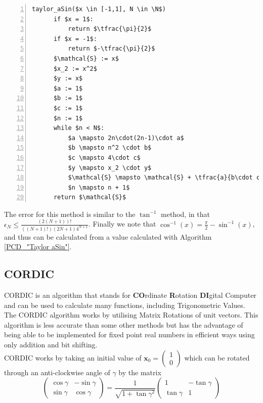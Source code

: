 {%
\begin{lstlisting}[numbers=left,frame=single,mathescape,caption={Taylor Method for \(\sin^{-1}\)},label={PCD_"Taylor aSin"}]
  taylor_aSin($x \in [-1,1], N \in \N$)
      if $x = 1$:
          return $\tfrac{\pi}{2}$
      if $x = -1$:
          return $-\tfrac{\pi}{2}$
      $\mathcal{S} := x$
      $x_2 := x^2$
      $y := x$
      $a := 1$
      $b := 1$
      $c := 1$
      $n := 1$
      while $n < N$:
          $a \mapsto 2n\cdot(2n-1)\cdot a$
          $b \mapsto n^2 \cdot b$
          $c \mapsto 4\cdot c$
          $y \mapsto x_2 \cdot y$
          $\mathcal{S} \mapsto \mathcal{S} + \tfrac{a}{b\cdot c \cdot(2n+1)}\cdot y$
          $n \mapsto n + 1$
      return $\mathcal{S}$
\end{lstlisting}

The error for this method is similar to the \(\tan^{-1}\) method, in that \(\epsilon_N \le \frac{(2(N+1))!}{((N+1)!)(2N+1)4^{N+1}}\). Finally we note that \(\cos^{-1}(x) = \tfrac{\pi}{2} - \sin^{-1}(x)\), and thus can be calculated from a value calculated with Algorithm \ref{PCD_"Taylor aSin"}.

\subsection{CORDIC}
\label{SUB_"CORDIC"}

\theoremstyle{plain}
\newtheorem{Cordic Gamma Property}{Proposition}[subsection]
\newtheorem{Cordic Accuracy}[Cordic Gamma Property]{Proposition}

CORDIC is an algorithm that stands for \textbf{CO}rdinate \textbf{R}otation \textbf{DI}gital Computer and can be used to calculate many functions, including Trigonometric Values. The CORDIC algorithm works by utilising Matrix Rotations of unit vectors. This algorithm is less accurate than some other methods but has the advantage of being able to be implemented for fixed point real numbers in efficient ways using only addition and bit shifting.\\

CORDIC works by taking an initial value of
\begin{math}
	\mathbf{x}_0 = \left( 
		\begin{array}{c}
			1 \\
			0
		\end{array} \right)
\end{math}
which can be rotated through an anti-clockwise angle of $\gamma$ by the matrix
\begin{displaymath}
	\left( \begin{array}{cc}
		\cos{\gamma} & -\sin{\gamma} \\
		\sin{\gamma} &  \cos{\gamma}
	\end{array} \right)
	= \frac{1}{\sqrt{1 + \tan{\gamma}^2}} \left( \begin{array}{cc}
		1 & -\tan{\gamma} \\
		\tan{\gamma} & 1
	\end{array} \right)
\end{displaymath}

}
